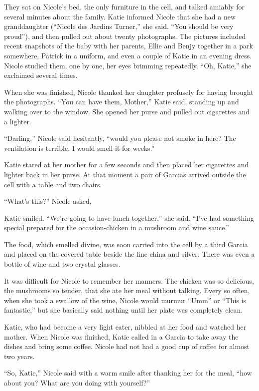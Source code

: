 \documentclass[]{article}
\begin{document}
{{They sat on Nicole’s bed, the only furniture in the cell, and talked amiably for several minutes about the family. Katie informed Nicole that she had a new granddaughter (“Nicole des Jardins Turner,” she said. “You should be very proud”), and then pulled out about twenty photographs. The pictures included recent snapshots of the baby with her parents, Ellie and Benjy together in a park somewhere, Patrick in a uniform, and even a couple of Katie in an evening dress. Nicole studied them, one by one, her eyes brimming repeatedly. “Oh, Katie,” she exclaimed several times.

When she was finished, Nicole thanked her daughter profusely for having brought the photographs. “You can have them, Mother,” Katie said, standing up and walking over to the window. She opened her purse and pulled out cigarettes and a lighter.

“Darling,” Nicole said hesitantly, “would you please not smoke in here? The ventilation is terrible. I would smell it for weeks.”

Katie stared at her mother for a few seconds and then placed her cigarettes and lighter back in her purse. At that moment a pair of Garcias arrived outside the cell with a table and two chairs.

“What’s this?” Nicole asked,

Katie smiled. “We’re going to have lunch together,” she said. “I’ve had something special prepared for the occasion-chicken in a mushroom and wine sauce.”

The food, which smelled divine, was soon carried into the cell by a third Garcia and placed on the covered table beside the fine china and silver. There was even a bottle of wine and two crystal glasses.

It was difficult for Nicole to remember her manners. The chicken was so delicious, the mushrooms so tender, that she ate her meal without talking. Every so often, when she took a swallow of the wine, Nicole would murmur “Umm” or “This is fantastic,” but she basically said nothing until her plate was completely clean.

Katie, who had become a very light eater, nibbled at her food and watched her mother. When Nicole was finished, Katie called in a Garcia to take away the dishes and bring some coffee. Nicole had not had a good cup of coffee for almost two years.

“So, Katie,” Nicole said with a warm smile after thanking her for the meal, “how about you? What are you doing with yourself?”

}}
\end{document}
